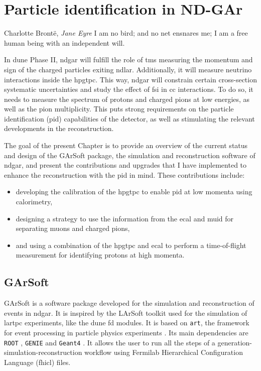 \chapter{Particle identification in ND-GAr}
\label{chapter:garsoft_pid}

\begin{chapquote}{Charlotte Brontë, \textit{Jane Eyre}}
	I am no bird; and no net ensnares me; I am a free human being with an independent will.
\end{chapquote}

In \gls{dune} Phase II, \gls{ndgar} will fulfill the role of \gls{tms} measuring the momentum and sign of the charged particles exiting \gls{ndlar}. Additionally, it will measure neutrino interactions inside the \gls{hpgtpc}. This way, \gls{ndgar} will constrain certain cross-section systematic uncertainties and study the effect of \gls{fsi} in \gls{cc} interactions. To do so, it needs to measure the spectrum of protons and charged pions at low energies, as well as the pion multiplicity. This puts strong requirements on the particle identification (\gls{pid}) capabilities of the detector, as well as stimulating the relevant developments in the reconstruction.

The goal of the present Chapter is to provide an overview of the current status and design of the GArSoft package, the simulation and reconstruction software of \gls{ndgar}, and present the contributions and upgrades that I have implemented to enhance the reconstruction with the \gls{pid} in mind. These contributions include:
\begin{itemize}
	\item developing the calibration of the \gls{hpgtpc} to enable \gls{pid} at low momenta using calorimetry,
	\item designing a strategy to use the information from the \gls{ecal} and \gls{muid} for separating muons and charged pions,
	\item and using a combination of the \gls{hpgtpc} and \gls{ecal} to perform a time-of-flight measurement for identifying protons at high momenta.
\end{itemize}

\section{GArSoft}\label{section:garsoft}

GArSoft is a software package developed for the simulation and reconstruction of events in \gls{ndgar}. It is inspired by the LArSoft toolkit \cite{Church2013} used for the simulation of \gls{lartpc} experiments, like the \gls{dune} \gls{fd} modules. It is based on \texttt{art}, the framework for event processing in particle physics experiments \cite{ART}. Its main dependencies are \texttt{ROOT} \cite{Brun1997}, \texttt{GENIE} \cite{Andreopoulos2009,Andreopoulos2015} and \texttt{Geant4} \cite{GEANT42002,GEANT42006,GEANT42016}. It allows the user to run all the steps of a generation-simulation-reconstruction workflow using Fermilab Hierarchical Configuration Language (\gls{fhicl}) files.

